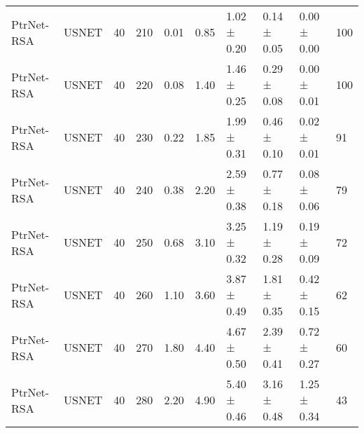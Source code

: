 \begin{longtable}[!htbp]{llll|lllll|l}
PtrNet-RSA           & USNET             & 40                   & 210                                                               & 0.01 & \multicolumn{1}{l|}{0.85}    & 1.02 ± 0.20 & 0.14 ± 0.05      & 0.00 ± 0.00                  & 100                                                                                    \\
PtrNet-RSA           & USNET             & 40                   & 220                                                               & 0.08 & \multicolumn{1}{l|}{1.40}     & 1.46 ± 0.25 & 0.29 ± 0.08      & 0.00 ± 0.01                  & 100                                                                                    \\
PtrNet-RSA           & USNET             & 40                   & 230                                                               & 0.22 & \multicolumn{1}{l|}{1.85}    & 1.99 ± 0.31 & 0.46 ± 0.10      & 0.02 ± 0.01                  & 91                                                                                    \\
PtrNet-RSA           & USNET             & 40                   & 240                                                               & 0.38 & \multicolumn{1}{l|}{2.20}     & 2.59 ± 0.38 & 0.77 ± 0.18      & 0.08 ± 0.06                  & 79                                                                                    \\
PtrNet-RSA           & USNET             & 40                   & 250                                                               & 0.68 & \multicolumn{1}{l|}{3.10}     & 3.25 ± 0.32 & 1.19 ± 0.28      & 0.19 ± 0.09                  & 72                                                                                    \\
PtrNet-RSA           & USNET             & 40                   & 260                                                               & 1.10  & \multicolumn{1}{l|}{3.60}     & 3.87 ± 0.49 & 1.81 ± 0.35      & 0.42 ± 0.15                  & 62                                                                                    \\
PtrNet-RSA           & USNET             & 40                   & 270                                                               & 1.80  & \multicolumn{1}{l|}{4.40}     & 4.67 ± 0.50 & 2.39 ± 0.41      & 0.72 ± 0.27                  & 60                                                                                    \\
PtrNet-RSA           & USNET             & 40                   & 280                                                               & 2.20  & \multicolumn{1}{l|}{4.90}     & 5.40 ± 0.46 & 3.16 ± 0.48      & 1.25 ± 0.34                  & 43                                                                                    \\

\end{longtable}
